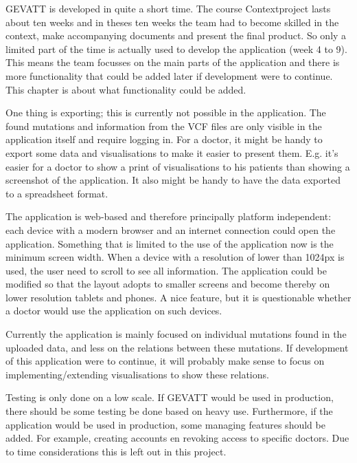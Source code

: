 GEVATT is developed in quite a short time. The course Contextproject lasts about ten weeks and in theses ten weeks the team had to become skilled in the context, make accompanying documents and present the final product. So only a limited part of the time is actually used to develop the application (week 4 to 9). This means the team focusses on the main parts of the application and there is more functionality that could be added later if development were to continue. This chapter is about what functionality could be added.

One thing is exporting; this is currently not possible in the application. The found mutations and information from the VCF files are only visible in the application itself and require logging in. For a doctor, it might be handy to export some data and visualisations to make it easier to present them. E.g. it's easier for a doctor to show a print of visualisations to his patients than showing a screenshot of the application. It also might be handy to have the data exported to a spreadsheet format.

The application is web-based and therefore principally platform independent: each device with a modern browser and an internet connection could open the application. Something that is limited to the use of the application now is the minimum screen width. When a device with a resolution of lower than 1024px is used, the user need to scroll to see all information. The application could be modified so that the layout adopts to smaller screens and become thereby on lower resolution tablets and phones. A nice feature, but it is questionable whether a doctor would use the application on such devices.

Currently the application is mainly focused on individual mutations found in the uploaded data, and less on the relations between these mutations. If development of this application were to continue, it will probably make sense to focus on implementing/extending visualisations to show these relations.

Testing is only done on a low scale. If GEVATT would be used in production, there should be some testing be done based on heavy use. Furthermore, if the application would be used in production, some managing features should be added. For example, creating accounts en revoking access to specific doctors. Due to time considerations this is left out in this project.